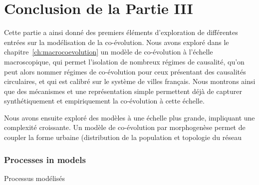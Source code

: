 





\chapter*{Conclusion de la Partie III}






Cette partie a ainsi donné des premiers éléments d'exploration de différentes entrées sur la modélisation de la co-évolution. Nous avons exploré dans le chapitre~\ref{ch:macrocoevolution} un modèle de co-évolution à l'échelle macroscopique, qui permet l'isolation de nombreux régimes de causalité, qu'on peut alors nommer régimes de co-évolution pour ceux présentant des causalités circulaires, et qui est calibré sur le système de villes français. Nous montrons ainsi que des mécanismes et une représentation simple permettent déjà de capturer synthétiquement et empiriquement la co-évolution à cette échelle.

Nous avons ensuite exploré des modèles à une échelle plus grande, impliquant une complexité croissante. Un modèle de co-évolution par morphogenèse permet de coupler la forme urbaine (distribution de la population et topologie du réseau




\subsection*{Processes in models}{Processus modélisés}


